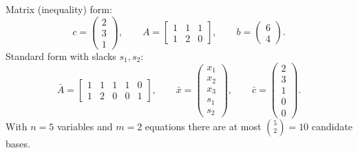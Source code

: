 \begin{solutions}
  \item Matrix (inequality) form:
        \[
          c=\begin{pmatrix}2\\3\\1\end{pmatrix},\qquad
          A=\begin{bmatrix}
              1 & 1 & 1\\
              1 & 2 & 0
            \end{bmatrix},\qquad
          b=\begin{pmatrix}6\\4\end{pmatrix}.
        \]
        Standard form with slacks $s_{1},s_{2}$:
        \[
          \bar{A}=\begin{bmatrix}
              1 & 1 & 1 & 1 & 0\\
              1 & 2 & 0 & 0 & 1
            \end{bmatrix},\qquad
          \bar{x}=\begin{pmatrix}x_{1}\\x_{2}\\x_{3}\\s_{1}\\s_{2}
            \end{pmatrix},\qquad
          \bar{c}=\begin{pmatrix}2\\3\\1\\0\\0\end{pmatrix}.
        \]
        With $n=5$ variables and $m=2$ equations there are at most
        $\binom{5}{2}=10$ candidate bases.


\end{solutions}
